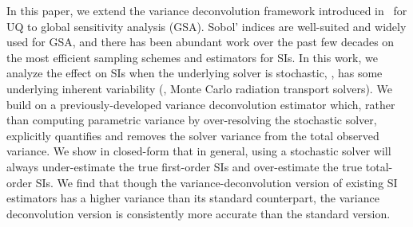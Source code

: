 In this paper, we extend the variance deconvolution framework introduced in~\cite{clements-etal-2024} for UQ to global sensitivity analysis (GSA).
Sobol' indices are well-suited and widely used for GSA, and there has been abundant work over the past few decades on the most efficient sampling schemes and estimators for SIs. 
In this work, we analyze the effect on SIs when the underlying solver is stochastic, \ie, has some underlying inherent variability (\eg, Monte Carlo radiation transport solvers).
We build on a previously-developed variance deconvolution estimator which, rather than computing parametric variance by over-resolving the stochastic solver, explicitly quantifies and removes the solver variance from the total observed variance.
We show in closed-form that in general, using a stochastic solver will always under-estimate the true first-order SIs and over-estimate the true total-order SIs. 
We find that though the variance-deconvolution version of existing SI estimators has a higher variance than its standard counterpart, the variance deconvolution version is consistently more accurate than the standard version.